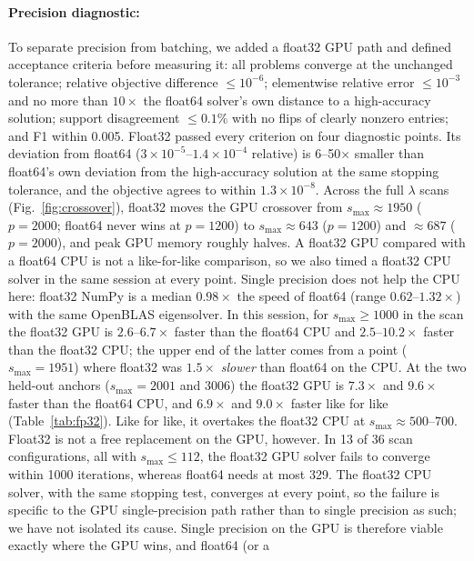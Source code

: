 \documentclass[pdflatex,sn-mathphys-num]{sn-jnl}
\begin{document}
\paragraph{Precision diagnostic:} To separate precision from batching, we
added a float32 GPU path and defined acceptance criteria before measuring
it: all problems
converge at the unchanged tolerance; relative objective difference
$\le10^{-6}$; elementwise relative error $\le10^{-3}$ and no more than
$10\times$ the float64 solver's own distance to a high-accuracy solution;
support disagreement $\le0.1\%$ with no flips of clearly nonzero entries; and
F1 within 0.005. Float32 passed every criterion on four diagnostic points.
Its deviation from float64 ($3\times10^{-5}$--$1.4\times10^{-4}$ relative)
is 6--50$\times$ smaller than float64's own deviation from the high-accuracy
solution at the same stopping tolerance, and the objective agrees to within
$1.3\times10^{-8}$.
Across the full $\lambda$ scans (Fig.~\ref{fig:crossover}), float32 moves
the GPU crossover from $s_{\max}\approx1950$ ($p=2000$; float64 never wins at
$p=1200$) to $s_{\max}\approx643$ ($p=1200$) and $\approx687$ ($p=2000$), and
peak GPU memory roughly halves.
A float32 GPU compared with a float64 CPU is not a like-for-like comparison,
so we also timed a float32 CPU solver in the same session at every point.
Single precision does not help the CPU here: float32 NumPy is a median
$0.98\times$ the speed of float64 (range $0.62$--$1.32\times$) with the same
OpenBLAS eigensolver. In this session, for $s_{\max}\ge1000$ in the scan
the float32 GPU is $2.6$--$6.7\times$ faster than the float64 CPU and
$2.5$--$10.2\times$ faster than the float32 CPU; the upper end of the latter
comes from a point ($s_{\max}=1951$) where float32 was $1.5\times$
\emph{slower} than float64 on the CPU. At the two held-out anchors
($s_{\max}=2001$ and $3006$) the float32 GPU is $7.3\times$ and $9.6\times$
faster than the float64 CPU, and $6.9\times$ and $9.0\times$ faster like for
like (Table~\ref{tab:fp32}). Like for like, it overtakes the float32 CPU at
$s_{\max}\approx500$--$700$.
Float32 is not a free replacement on the GPU, however. In 13 of 36 scan
configurations, all with $s_{\max}\le112$, the float32 GPU solver fails to
converge within 1000 iterations, whereas float64 needs at most 329. The
float32 CPU solver, with the same stopping test, converges at every point,
so the failure is specific to the GPU single-precision path rather than to
single precision as such; we have not isolated its cause. Single precision on
the GPU is therefore viable exactly where the GPU wins, and float64 (or a
\end{document}
